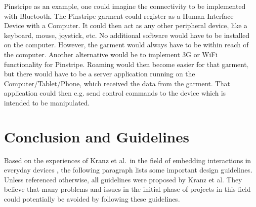 Pinstripe as an example, one could imagine the connectivity to be implemented with Bluetooth.
The Pinstripe garment could register as a Human Interface Device with a Computer.
It could then act as any other peripheral device, like a keyboard, mouse, joystick, etc. 
No additional software would have to be installed on the computer. 
However, the garment would always have to be within reach of the computer.
Another alternative would be to implement 3G or WiFi functionality for Pinstripe.
Roaming would then become easier for that garment, but there would have to be a server application running on the Computer/Tablet/Phone, which received the data from the garment. 
That application could then e.g. send control commands to the device which is intended to be manipulated.

\section{Conclusion and Guidelines}
\label{sec:conclusion}
Based on the experiences of Kranz et al.\ in the field of embedding interactions in everyday devices \cite{kranz10}, the following paragraph lists some important design guidelines.
Unless referenced otherwise, all guidelines were proposed by Kranz et al.
They believe that many problems and issues in the initial phase of projects in this field could potentially be avoided by following these guidelines.
